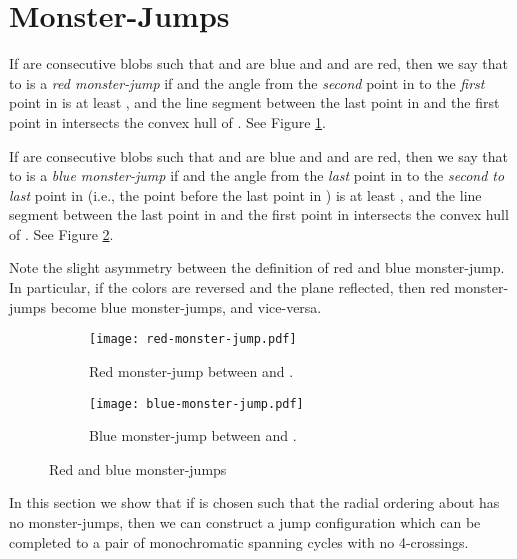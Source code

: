 \documentclass[12pt]{article}
\theoremstyle{definition}
\begin{document}
\section{Monster-Jumps}

If  are consecutive blobs such that  and  are blue and  and  are red, then we say that  to  is a \emph{red monster-jump} if  and the angle from the \emph{second} point in  to the \emph{first} point in  is at least , and the line segment between the last point in  and the first point in  intersects the convex hull of . See Figure \ref{fig:red-monster-jump}.

If  are consecutive blobs such that  and  are blue and  and  are red, then we say that  to  is a \emph{blue monster-jump} if  and the angle from the \emph{last} point in  to the \emph{second to last} point in  (i.e., the point before the last point in ) is at least , and the line segment between the last point in  and the first point in  intersects the convex hull of . See Figure \ref{fig:blue-monster-jump}.

Note the slight asymmetry between the definition of red and blue monster-jump.
In particular, if the colors are reversed and the plane reflected, then red monster-jumps become blue monster-jumps, and vice-versa.

\begin{figure}
\centering
\begin{subfigure}[b]{0.4\textwidth}
\centering
\texttt{[image: red-monster-jump.pdf]}
\caption{Red monster-jump between  and .}
\label{fig:red-monster-jump}
\end{subfigure}
\quad
\begin{subfigure}[b]{0.4\textwidth}
\centering
\texttt{[image: blue-monster-jump.pdf]}
\caption{Blue monster-jump between  and .}
\label{fig:blue-monster-jump}
\end{subfigure}
\caption{Red and blue monster-jumps}
\label{fig:monster-jumps}
\end{figure}

In this section we show that if  is chosen such that the radial ordering about  has no monster-jumps, then we can construct a jump configuration which can be completed to a pair of monochromatic spanning cycles with no 4-crossings. 
\end{document}
